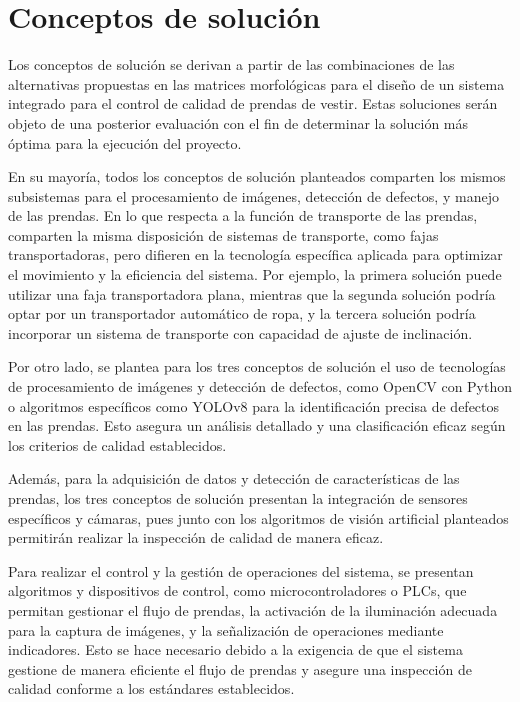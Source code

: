 \section{Conceptos de solución}

Los conceptos de solución se derivan a partir de las combinaciones de las alternativas propuestas en las matrices morfológicas para el diseño de un sistema integrado para el control de calidad de prendas de vestir. Estas soluciones serán objeto de una posterior evaluación con el fin de determinar la solución más óptima para la ejecución del proyecto.

En su mayoría, todos los conceptos de solución planteados comparten los mismos subsistemas para el procesamiento de imágenes, detección de defectos, y manejo de las prendas. En lo que respecta a la función de transporte de las prendas, comparten la misma disposición de sistemas de transporte, como fajas transportadoras, pero difieren en la tecnología específica aplicada para optimizar el movimiento y la eficiencia del sistema. Por ejemplo, la primera solución puede utilizar una faja transportadora plana, mientras que la segunda solución podría optar por un transportador automático de ropa, y la tercera solución podría incorporar un sistema de transporte con capacidad de ajuste de inclinación.

Por otro lado, se plantea para los tres conceptos de solución el uso de tecnologías de procesamiento de imágenes y detección de defectos, como OpenCV con Python o algoritmos específicos como YOLOv8 para la identificación precisa de defectos en las prendas. Esto asegura un análisis detallado y una clasificación eficaz según los criterios de calidad establecidos.

Además, para la adquisición de datos y detección de características de las prendas, los tres conceptos de solución presentan la integración de sensores específicos y cámaras, pues junto con los algoritmos de visión artificial planteados permitirán realizar la inspección de calidad de manera eficaz.

Para realizar el control y la gestión de operaciones del sistema, se presentan algoritmos y dispositivos de control, como microcontroladores o PLCs, que permitan gestionar el flujo de prendas, la activación de la iluminación adecuada para la captura de imágenes, y la señalización de operaciones mediante indicadores. Esto se hace necesario debido a la exigencia de que el sistema gestione de manera eficiente el flujo de prendas y asegure una inspección de calidad conforme a los estándares establecidos.

